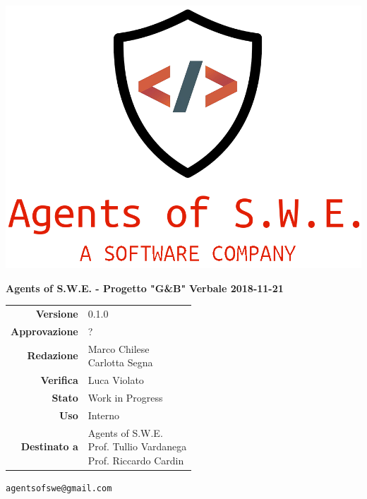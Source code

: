 


\begin{titlepage}
\thispagestyle{empty}

\begin{center}

\includegraphics[scale=0.3]{./images/logo.png} 




\large \textbf{Agents of S.W.E. - Progetto "G\&B"}
\vfill
\Huge \textbf{Verbale 2018-11-21}
\vfill
\large
\renewcommand{\arraystretch}{1.3}
\begin{tabular}{r|l}
\textbf{Versione} & 0.1.0\\
\textbf{Approvazione} & ?\\
\textbf{Redazione} & \parbox[t]{5cm}{Marco Chilese\\Carlotta Segna}\\
\textbf{Verifica} & \parbox[t]{5cm}{Luca Violato}\\
\textbf{Stato} & Work in Progress\\
\textbf{Uso} & Interno\\
\textbf{Destinato a} & \parbox[t]{5cm}{Agents of S.W.E.  \\Prof. Tullio Vardanega\\Prof. Riccardo Cardin}
\end{tabular}
\vfill
\small
\texttt{agentsofswe@gmail.com}
\end{center}
\end{titlepage}

\pagebreak














